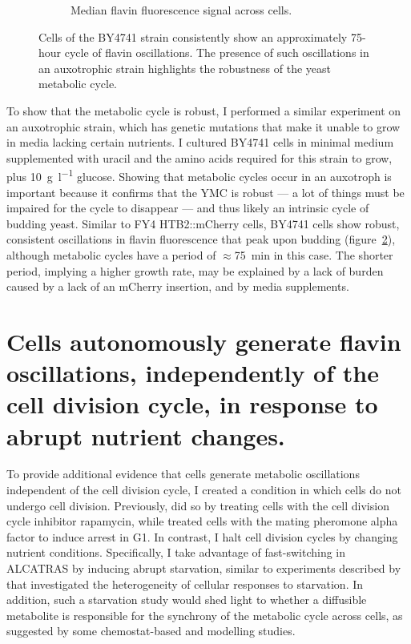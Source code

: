 \begin{figure}
\begin{subfigure}[htpb]{0.4\textwidth}
   \caption{
    Median flavin fluorescence signal across cells.
   }
   \label{fig:biology-by4741-sync-median}
  \end{subfigure}

  \caption{
    Cells of the BY4741 strain consistently show an approximately 75-hour cycle of flavin oscillations.
    The presence of such oscillations in an auxotrophic strain highlights the robustness of the yeast metabolic cycle.
  }
  \label{fig:biology-by4741-sync}
\end{figure}

To show that the metabolic cycle is robust, I performed a similar experiment on an auxotrophic strain, which has genetic mutations that make it unable to grow in media lacking certain nutrients.
I cultured BY4741 cells in minimal medium supplemented with uracil and the amino acids required for this strain to grow, plus \SI{10}{\gram~\litre^{-1}} glucose.
Showing that metabolic cycles occur in an auxotroph is important because it confirms that the YMC is robust --- a lot of things must be impaired for the cycle to disappear --- and thus likely an intrinsic cycle of budding yeast.
Similar to FY4 HTB2::mCherry cells, BY4741 cells show robust, consistent oscillations in flavin fluorescence that peak upon budding (figure~\ref{fig:biology-by4741-sync}), although metabolic cycles have a period of $\approx$\SI{75}{\minute} in this case.
The shorter period, implying a higher growth rate, may be explained by a lack of burden caused by a lack of an mCherry insertion, and by media supplements.


\section[Abrupt nutrient changes]{Cells autonomously generate flavin oscillations, independently of the cell division cycle, in response to abrupt nutrient changes.}
\label{sec:biology-abrupt}

To provide additional evidence that cells generate metabolic oscillations independent of the cell division cycle, I created a condition in which cells do not undergo cell division.
Previously, \textcite{baumgartnerFlavinbasedMetabolicCycles2018} did so by treating cells with the cell division cycle inhibitor rapamycin, while \textcite{papagiannakisAutonomousMetabolicOscillations2017} treated cells with the mating pheromone alpha factor to induce arrest in G1.
In contrast, I halt cell division cycles by changing nutrient conditions.
Specifically, I take advantage of fast-switching in ALCATRAS by inducing abrupt starvation, similar to experiments described by \textcite{bagameryPutativeBetHedgingStrategy2020} that investigated the heterogeneity of cellular responses to starvation.
In addition, such a starvation study would shed light to whether a diffusible metabolite is responsible for the synchrony of the metabolic cycle across cells, as suggested by some chemostat-based and modelling studies. %


